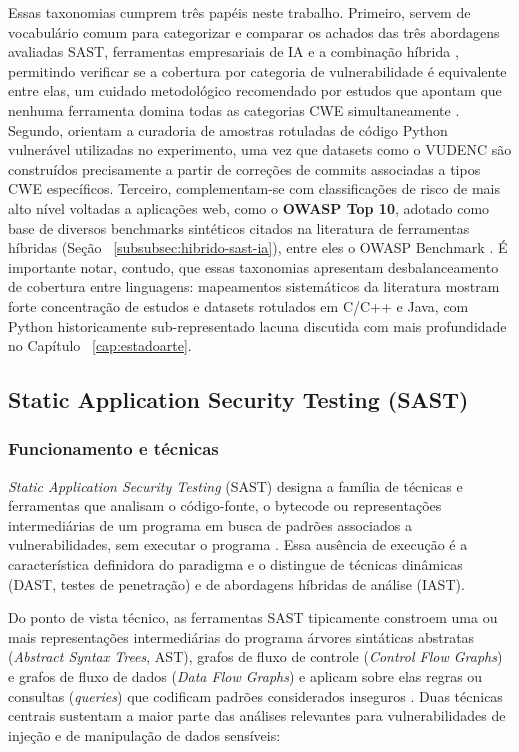Essas taxonomias cumprem três papéis neste trabalho. Primeiro, servem de vocabulário comum para categorizar e comparar os achados das três abordagens avaliadas SAST, ferramentas empresariais de IA e a combinação híbrida , permitindo verificar se a cobertura por categoria de vulnerabilidade é equivalente entre elas, um cuidado metodológico recomendado por estudos que apontam que nenhuma ferramenta domina todas as categorias CWE simultaneamente \cite{Esposito2024SASTComparison, Zhu2024SASTAndroid}. Segundo, orientam a curadoria de amostras rotuladas de código Python vulnerável utilizadas no experimento, uma vez que datasets como o VUDENC são construídos precisamente a partir de correções de commits associadas a tipos CWE específicos. Terceiro, complementam-se com classificações de risco de mais alto nível voltadas a aplicações web, como o \textbf{OWASP Top 10}, adotado como base de diversos benchmarks sintéticos citados na literatura de ferramentas híbridas (Seção ~\ref{subsubsec:hibrido-sast-ia}), entre eles o OWASP Benchmark \cite{OWASP2021Top10}. É importante notar, contudo, que essas taxonomias apresentam desbalanceamento de cobertura entre linguagens: mapeamentos sistemáticos da literatura mostram forte concentração de estudos e datasets rotulados em C/C++ e Java, com Python historicamente sub-representado \cite{Kalouptsoglou2023VulnPrediction, Germano2025LLMSLR} lacuna discutida com mais profundidade no Capítulo ~\ref{cap:estadoarte}.


\subsection{Static Application Security Testing (SAST)}\label{subsec:sast}
\subsubsection{Funcionamento e técnicas}\label{subsubsec:sast-funcionamento}
\textit{Static Application Security Testing} (SAST) designa a família de técnicas e ferramentas que analisam o código-fonte, o bytecode ou representações intermediárias de um programa em busca de padrões associados a vulnerabilidades, sem executar o programa \cite{Dalaq2025SASTSLR}. Essa ausência de execução é a característica definidora do paradigma e o distingue de técnicas dinâmicas (DAST, testes de penetração) e de abordagens híbridas de análise (IAST).

Do ponto de vista técnico, as ferramentas SAST tipicamente constroem uma ou mais representações intermediárias do programa  árvores sintáticas abstratas (\textit{Abstract Syntax Trees}, AST), grafos de fluxo de controle (\textit{Control Flow Graphs}) e grafos de fluxo de dados (\textit{Data Flow Graphs})  e aplicam sobre elas regras ou consultas (\textit{queries}) que codificam padrões considerados inseguros \cite{Li2024SASTCC, Dalaq2025SASTSLR}. Duas técnicas centrais sustentam a maior parte das análises relevantes para vulnerabilidades de injeção e de manipulação de dados sensíveis:



